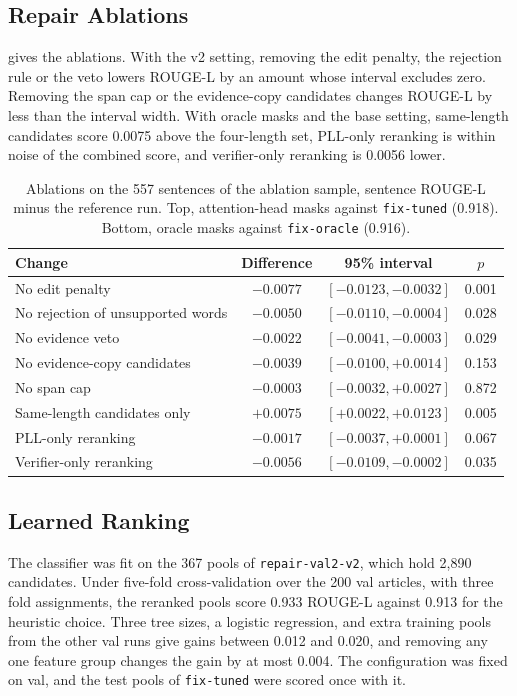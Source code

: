 \documentclass[]{paper}
\newcommand{\run}[1]{\texttt{#1}}
\begin{document}
\subsection{Repair Ablations}

 gives the ablations. With the v2 setting, removing the edit penalty, the rejection rule or the veto lowers ROUGE-L by an amount whose interval excludes zero. Removing the span cap or the evidence-copy candidates changes ROUGE-L by less than the interval width. With oracle masks and the base setting, same-length candidates score 0.0075 above the four-length set, PLL-only reranking is within noise of the combined score, and verifier-only reranking is 0.0056 lower.

\begin{table}[H]
\caption{Ablations on the 557 sentences of the ablation sample, sentence ROUGE-L minus the reference run. Top, attention-head masks against \run{fix-tuned} (0.918). Bottom, oracle masks against \run{fix-oracle} (0.916).}
\label{tab:ablations}
\centering
\footnotesize
\begin{tabular}{lccc}
\toprule
Change & Difference & 95\% interval & $p$ \\
\midrule
No edit penalty & $-0.0077$ & $[-0.0123, -0.0032]$ & 0.001 \\
No rejection of unsupported words & $-0.0050$ & $[-0.0110, -0.0004]$ & 0.028 \\
No evidence veto & $-0.0022$ & $[-0.0041, -0.0003]$ & 0.029 \\
No evidence-copy candidates & $-0.0039$ & $[-0.0100, +0.0014]$ & 0.153 \\
No span cap & $-0.0003$ & $[-0.0032, +0.0027]$ & 0.872 \\
\midrule
Same-length candidates only & $+0.0075$ & $[+0.0022, +0.0123]$ & 0.005 \\
PLL-only reranking & $-0.0017$ & $[-0.0037, +0.0001]$ & 0.067 \\
Verifier-only reranking & $-0.0056$ & $[-0.0109, -0.0002]$ & 0.035 \\
\bottomrule
\end{tabular}
\end{table}

\subsection{Learned Ranking}

The classifier was fit on the 367 pools of \run{repair-val2-v2}, which hold 2,890 candidates. Under five-fold cross-validation over the 200 val articles, with three fold assignments, the reranked pools score 0.933 ROUGE-L against 0.913 for the heuristic choice. Three tree sizes, a logistic regression, and extra training pools from the other val runs give gains between 0.012 and 0.020, and removing any one feature group changes the gain by at most 0.004. The configuration was fixed on val, and the test pools of \run{fix-tuned} were scored once with it.
\end{document}
